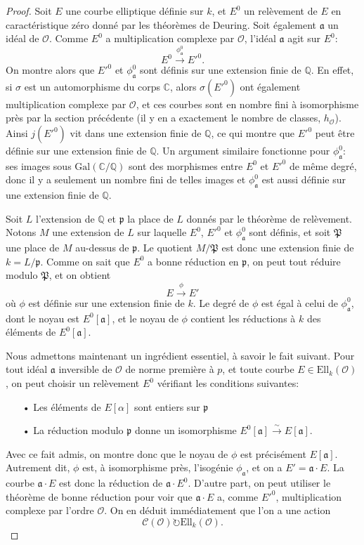 \documentclass[11pt,a4paper]{article}
\newcommand{\C}{\mathbb{C}}
\newcommand{\Q}{\mathbb{Q}}
\renewcommand{\O}{\mathcal{O}}
\newcommand{\Cl}{\mathcal{C}}
\newcommand{\vers}{\longrightarrow}
\newcommand{\Ell}{\mathrm{Ell}}
\newcommand{\Gal}{\mathrm{Gal}}
\renewcommand{\frak}{\mathfrak}
\theoremstyle{definition}
\begin{document}
\begin{proof}

Soit $E$ une courbe elliptique définie sur $k$, et $E^0$ un relèvement de $E$ en caractéristique zéro donné par les théorèmes de Deuring. Soit également $\frak a$ un idéal de $\O$. Comme $E^0$ a multiplication complexe par $\O$, l'idéal $\frak a$ agit sur $E^0$:
$$E^0 \overset{\phi_{\frak a}^0}{\vers} E'^0.$$
On montre alors que $E'^0$ et $\phi_{\frak a}^0$ sont définis sur une extension finie de $\Q$. En effet, si $\sigma$ est un automorphisme du corps $\C$, alors $\sigma(E'^0)$ ont également multiplication complexe par $\O$, et ces courbes sont en nombre fini à isomorphisme près par la section précédente (il y en a exactement le nombre de classes, $h_\O$). Ainsi $j(E'^0)$ vit dans une extension finie de $\Q$, ce qui montre que $E'^0$ peut être définie sur une extension finie de $\Q$. Un argument similaire fonctionne pour $\phi_{\frak a}^0$: ses images sous $\Gal(\C/\Q)$ sont des morphismes entre $E^0$ et $E'^0$ de même degré, donc il y a seulement un nombre fini de telles images et $\phi_{\frak a}^0$ est aussi définie sur une extension finie de $\Q$.

Soit $L$ l'extension de $\Q$ et $\frak p$ la place de $L$ donnés par le théorème de relèvement. Notons $M$ une extension de $L$ sur laquelle $E^0$, $E'^0$ et $\phi_{\frak a}^0$ sont définis, et soit $\frak P$ une place de $M$ au-dessus de $\frak p$. Le quotient $M/\frak P$ est donc une extension finie de $k = L/\frak p$. Comme on sait que $E^0$ a bonne réduction en $\frak p$, on peut tout réduire modulo $\frak P$, et on obtient
$$E \overset{\phi}{\vers} E'$$
où $\phi$ est définie sur une extension finie de $k$. Le degré de $\phi$ est égal à celui de $\phi_{\frak a}^0$, dont le noyau est $E^0[\frak a]$, et le noyau de $\phi$ contient les réductions à $k$ des éléments de $E^0[\frak a]$. 

Nous admettons maintenant un ingrédient essentiel, à savoir le fait suivant. Pour tout idéal $\frak a$ inversible de $\O$ de norme première à $p$, et toute courbe $E\in \Ell_k(\O)$, on peut choisir un relèvement $E^0$ vérifiant les conditions suivantes:
\begin{itemize}
\item[•] Les éléments de $E[\alpha]$ sont entiers sur $\frak p$
\item[•] La réduction modulo $\frak p$ donne un isomorphisme $E^0[\frak a] \overset{\sim}{\to} E[\frak a]$.
\end{itemize}

Avec ce fait admis, on montre donc que le noyau de $\phi$ est précisément $E[\frak a]$. Autrement dit, $\phi$ est, à isomorphisme près, l'isogénie $\phi_{\frak a}$, et on a $E' = \frak a\cdot E$. La courbe $\frak a\cdot E$ est donc la réduction de $\frak a\cdot E^0$. D'autre part, on peut utiliser le théorème de bonne réduction pour voir que $\frak a\cdot E$ a, comme $E'^0$, multiplication complexe par l'ordre $\O$. On en déduit immédiatement que l'on a une action
$$\Cl(\O) \circlearrowright \Ell_k(\O).$$


\end{proof}
\end{document}
